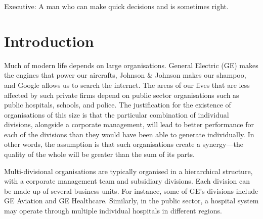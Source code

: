 \documentclass[a4paper, nobind, dvipsnames]{templates/ociamthesis}
\theoremstyle{definition}
\theoremstyle{definition}
\theoremstyle{definition}
\theoremstyle{definition}
\theoremstyle{remark}
\begin{document}
\begin{romanpages}
\tableofcontents

\listoffigures
	\mtcaddchapter

\listoftables
  \mtcaddchapter

\end{romanpages}

\flushbottom



\begin{savequote}
Executive: A man who can make quick decisions and is sometimes right.
\end{savequote}

\hypertarget{introduction}{%
\chapter{Introduction}\label{introduction}}

\minitoc

Much of modern life depends on large organisations. General Electric (GE) makes
the engines that power our aircrafts, Johnson \& Johnson makes our shampoo, and
Google allows us to search the internet. The areas of our lives that are less
affected by such private firms depend on public sector organisations such as
public hospitals, schools, and police. The justification for the existence of
organisations of this size is that the particular combination of individual
divisions, alongside a corporate management, will lead to better performance for
each of the divisions than they would have been able to generate individually.
In other words, the assumption is that such organisations create a synergy---the
quality of the whole will be greater than the sum of its parts.

Multi-divisional organisations are typically organised in a hierarchical
structure, with a corporate management team and subsidiary divisions. Each
division can be made up of several business units. For instance, some of GE's
divisions include GE Aviation and GE Healthcare. Similarly, in the public
sector, a hospital system may operate through multiple individual hospitals in
different regions.
\end{document}

